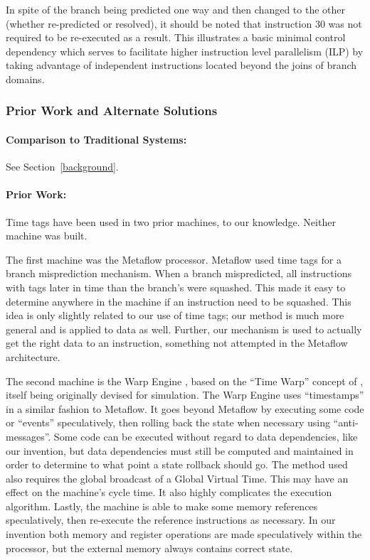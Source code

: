 \documentclass[10pt,dvips]{article}
\begin{document}
In spite of the branch being predicted one way and then changed
to the other (whether re-predicted or resolved), it should be
noted that instruction 30 was not required to be re-executed as
a result.  This illustrates a basic minimal control dependency
which serves to facilitate higher instruction level parallelism (ILP)
by taking advantage of independent instructions located beyond the
joins of branch domains.


\subsubsection{Prior Work and Alternate Solutions}
\label{priorwork}
\paragraph{Comparison to Traditional Systems: }
See Section~\ref{background}.

\paragraph{Prior Work: }
Time tags have been used in two prior machines, to our knowledge.
Neither machine was built.

The first machine was the Metaflow processor\cite{Popescu91}.
Metaflow used time tags for a branch misprediction mechanism.
When a branch mispredicted, all instructions with tags
later in time than the branch's were squashed. This made it
easy to determine anywhere in the machine if an instruction need
to be squashed. This idea is only slightly related to our
use of time tags; our method is much more general and is applied
to data as well. Further, our mechanism is used to actually get the
right data to an instruction, something not attempted in
the Metaflow architecture.

The second machine is the Warp Engine
\cite{Cleary95}, based on the ``Time Warp''
concept of \cite{Jefferson85}, itself
being originally
devised for simulation. The Warp Engine uses ``timestamps'' in
a similar fashion to Metaflow. It goes beyond Metaflow by
executing some code or ``events'' speculatively, then rolling
back the state when necessary using ``anti-messages''. Some
code can be executed without regard to data dependencies, like
our invention, but data dependencies must still be computed and
maintained in order to determine to what point a state
rollback should go. The method used also requires the global
broadcast of a Global Virtual Time. This may have an effect on
the machine's cycle time. It also highly complicates the execution
algorithm. Lastly, the machine is able to make some memory
references speculatively, then re-execute the reference instructions
as necessary. In our invention both memory and register operations
are made speculatively within the processor, but the external memory
always contains correct state.
\end{document}
